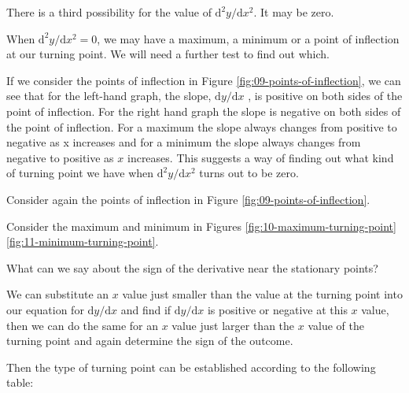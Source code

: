 \documentclass[
  english,
  11pt,
  oneside]{book}
\newcommand{\slide}{}
\theoremstyle{definition}
\theoremstyle{definition}
\theoremstyle{definition}
\theoremstyle{definition}
\theoremstyle{remark}
\begin{document}
There is a third possibility for the value of \(\mathrm{d}^{2}y/\mathrm{d} x^2\). It may be zero.

When \(\mathrm{d}^{2}y/\mathrm{d} x^2=0\), we may have a maximum, a minimum or a point of inflection at our turning point. We will need a further test to find out which.

\begin{notslides}

If we consider the points of inflection in Figure \ref{fig:09-points-of-inflection}, we can see that for the left-hand graph, the slope, \(\mathrm{d}y/\mathrm{d} x\) , is positive on both sides of the point of inflection. For the right hand graph the slope is negative on both sides of the point of inflection. For a maximum the slope always changes from positive to negative as x increases and for a minimum the slope always changes from negative to positive as \(x\) increases. This suggests a way of finding out what kind of turning point we have when \(\mathrm{d}^{2}y/\mathrm{d} x^2\) turns out to be zero.

\end{notslides}

\begin{slidesonly}

Consider again the points of inflection in Figure \ref{fig:09-points-of-inflection}.

\vfill

Consider the maximum and minimum in Figures \ref{fig:10-maximum-turning-point} \ref{fig:11-minimum-turning-point}.

\vfill

What can we say about the sign of the derivative near the stationary points?

\end{slidesonly}

\slide

We can substitute an \(x\) value just smaller than the value at the turning point into our equation for \(\mathrm{d}y/\mathrm{d} x\) and find if \(\mathrm{d}y/\mathrm{d} x\) is positive or negative at this \(x\) value, then we can do the same for an \(x\) value just larger than the \(x\) value of the turning point and again determine the sign of the outcome.

\slide

Then the type of turning point can be established according to the following table:
\end{document}
